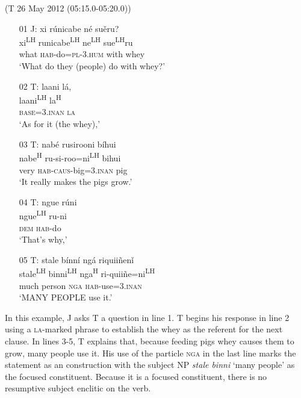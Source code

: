 \ea\label{objectni}(T 26 May 2012 (05:15.0-05:20.0))
\begin{itemize}

\item[01 J:]
xi r\'{u}nicabe n\'{e} su\v{e}ru?  \\
xi\textsuperscript{LH} runicabe\textsuperscript{LH} ne\textsuperscript{LH} sue\textsuperscript{LH}ru  \\
what \textsc{hab}-do=\textsc{pl}-\textsc{3.hum} with whey  \\
\glt `What do they (people) do with whey?'


\item[02 T:]
\glll laani l\'{a},  \\
laani\textsuperscript{LH} la\textsuperscript{H}  \\
\textsc{base}=\textsc{3.inan} \textsc{la}  \\
\glt `As for it (the whey),'


\item[03 T:]
\glll nab\'{e} rusirooni b\'{i}hui  \\
nabe\textsuperscript{H} ru-si-roo=ni\textsuperscript{LH} bihui  \\
very \textsc{hab}-\textsc{caus}-big=\textsc{3.inan} pig  \\
\glt `It really makes the pigs grow.' 


\item[04 T:]
\glll ngue r\'{u}ni  \\
ngue\textsuperscript{LH} ru-ni  \\
\textsc{dem} \textsc{hab}-do  \\
\glt `That's why,'


\item[05 T:]
\glll stale b\'{i}nn\'{i} ng\'{a} riquii\~{n}en\v{i}  \\
stale\textsuperscript{LH} binni\textsuperscript{LH} nga\textsuperscript{H} ri-quii\~{n}e=ni\textsuperscript{LH}  \\
much person \textsc{nga} \textsc{hab}-use=\textsc{3.inan}  \\
\glt `MANY PEOPLE use it.' 


\end{itemize}
\z
In this example, J asks T a question in line 1. T begins his response in line 2 using a \textsc{la}-marked phrase to establish the whey as the  referent for the next clause. In lines 3-5, T explains that, because feeding pigs whey causes them to grow, many people use it. His use of the particle \textsc{nga} in the last line marks the statement as an  construction with the subject NP \textit{stale binni} `many people' as the focused constituent. Because it is a focused constituent, there is no resumptive subject enclitic on the verb. 

